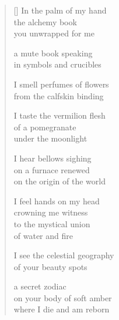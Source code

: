 \documentclass[12pt,a4paper]{article}
\begin{document}
\begin{verse}[\versewidth]
  In the palm of my hand \\
  the alchemy book \\
  you unwrapped for me

  a mute book speaking \\
  in symbols and crucibles

  I smell perfumes of flowers \\
  from the calfskin binding

  I taste the vermilion flesh \\
  of a pomegranate \\
  under the moonlight

  I hear bellows sighing \\
  on a furnace renewed \\
  on the origin of the world

  I feel hands on my head \\
  crowning me witness \\
  to the mystical union \\
  of water and fire

  I see the celestial geography \\
  of your beauty spots

  a secret zodiac \\
  on your body of soft amber \\
  where I die and am reborn
\end{verse}


\newpage

\poemtitle{}

\settowidth{\versewidth}{would meet the night immense}

\bigskip
\end{document}
